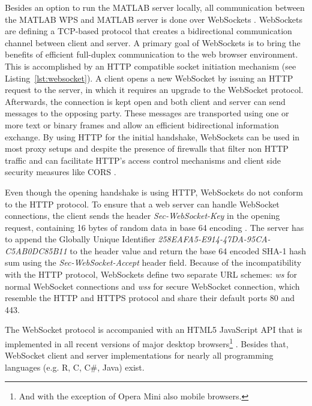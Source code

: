 		Besides an option to run the MATLAB server locally, all communication between the MATLAB WPS and MATLAB server is done over WebSockets \citep{ietf:rfc6455}. WebSockets are defining a TCP-based protocol that creates a bidirectional communication channel between client and server. A primary goal of WebSockets is to bring the benefits of efficient full-duplex communication to the web browser environment. This is accomplished by an HTTP compatible socket initiation mechanism (see Listing~\ref{lst:websocket}). A client opens a new WebSocket by issuing an HTTP request to the server, in which it requires an upgrade to the WebSocket protocol. Afterwards, the connection is kept open and both client and server can send messages to the opposing party. These messages are transported using one or more text or binary frames and allow an efficient bidirectional information exchange. By using HTTP for the initial handshake, WebSockets can be used in most proxy setups and despite the presence of firewalls that filter non HTTP traffic and can facilitate HTTP's access control mechanisms and client side security measures like \acl{CORS} \citep[\acs{CORS},][]{w3c:cors}.

		

		Even though the opening handshake is using HTTP, WebSockets do not conform to the HTTP protocol. To ensure that a web server can handle WebSocket connections, the client sends the header \emph{Sec-WebSocket-Key} in the opening request, containing 16 bytes of random data in base 64 encoding \citep{ietf:rfc4648}. The server has to append the Globally Unique Identifier \cite[GUID,][]{ietf:rfc4122} \emph{258EAFA5-E914-47DA-95CA-C5AB0DC85B11} to the header value and return the base 64 encoded SHA-1 \citep{NistFIPS1803} hash sum using the \emph{Sec-WebSocket-Accept} header field. Because of the incompatibility with the HTTP protocol, WebSockets define two separate URL schemes: \emph{ws} for normal WebSocket connections and \emph{wss} for secure WebSocket connection, which resemble the HTTP and HTTPS protocol and share their default ports 80 and 443.

		The WebSocket protocol is accompanied with an HTML5 JavaScript \ac{API} \citep{w3c:ws} that is implemented in all recent versions of major desktop browsers\footnote{And with the exception of Opera Mini also mobile browsers.} \citep{caniuse}. Besides that, WebSocket client and server implementations for nearly all programming languages (e.g. R, C, C\#, Java) exist.

